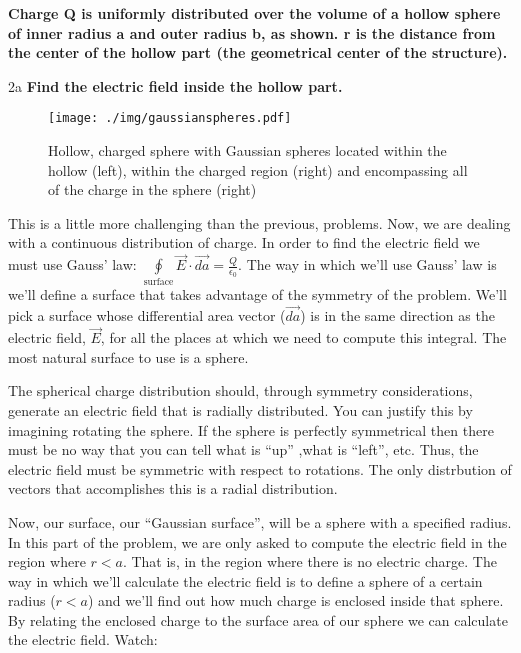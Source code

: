 \begin{homeworkProblem}[Quiz 3, Pr. 2]
    \textbf{Charge Q is uniformly distributed over the volume of a
    hollow sphere of inner radius a and outer radius b, as shown. r is
    the distance from the center of the hollow part (the geometrical
    center of the structure).}

    \begin{homeworkSection}{2a}
        \textbf{Find the electric field inside the hollow part.}
        \\
        
        \begin{figure}[t]
            \centering
            \texttt{[image: ./img/gaussianspheres.pdf]}
            \caption{Hollow, charged sphere with Gaussian spheres
            located within the hollow (left), within the charged region
            (right) and encompassing all of the charge in the sphere
            (right)}
            \label{fig:gaussianspheres.eps}
        \end{figure}

        This is a little more challenging than the previous, problems.
        Now, we are dealing with a continuous distribution of charge. In
        order to find the electric field we must use Gauss' law:
        $\oint\limits_{\text{surface}}
        \vec{E}\cdot\vec{da} = \frac{Q}{\epsilon_0}$. The way in which
        we'll use Gauss' law is we'll define a surface that takes
        advantage of the symmetry of the problem. We'll pick a surface
        whose differential area vector ($\vec{da}$) is in the same
        direction as the electric field, $\vec{E}$, for all the places
        at which we need to compute this integral. The most natural
        surface to use is a sphere.
        
        The spherical charge distribution should, through symmetry
        considerations, generate an electric field that is radially
        distributed. You can justify this by imagining rotating the
        sphere. If the sphere is perfectly symmetrical then there must
        be no way that you can tell what is ``up'' ,what is ``left'',
        etc. Thus, the electric field must be symmetric with respect to
        rotations. The only distrbution of vectors that accomplishes
        this is a radial distribution.
        
        Now, our surface, our ``Gaussian surface'', will be a sphere
        with a specified radius. In this part of the problem, we are
        only asked to compute the electric field in the region where
        $r<a$. That is, in the region where there is no electric charge.
        The way in which we'll calculate the electric field is to define
        a sphere of a certain radius ($r<a$) and we'll find out how much
        charge is enclosed inside that sphere. By relating the enclosed
        charge to the surface area of our sphere we can calculate the
        electric field. Watch:


\end{homeworkSection}
\end{homeworkProblem}
